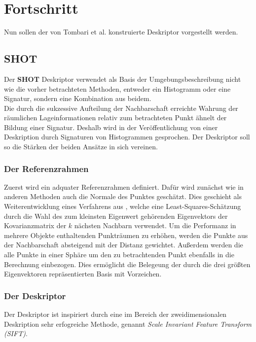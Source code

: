 \documentclass[12pt]{article}
\begin{document}
\section{Fortschritt}\label{prog}
Nun sollen der von Tombari et al. konstruierte Deskriptor vorgestellt werden. 

\subsection{SHOT}%
Der \textbf{SHOT} Deskriptor verwendet als Basis der Umgebungsbeschreibung nicht wie die vorher betrachteten Methoden, entweder ein Histogramm oder eine Signatur, sondern eine Kombination aus beidem.\\
Die durch die sukzessive Aufteilung der Nachbarschaft erreichte Wahrung der räumlichen Lageinformationen relativ zum betrachteten Punkt ähnelt der Bildung einer Signatur. Deshalb wird in der Veröffentlichung von einer Deskription durch Signaturen von Histogrammen gesprochen. Der Deskriptor soll so die Stärken der beiden Ansätze in sich vereinen.\\

\subsubsection{Der Referenzrahmen}
Zuerst wird ein adquater Referenzrahmen definiert. Dafür wird zunächst wie in anderen Methoden auch die Normale des Punktes geschätzt. Dies geschieht als Weiterentwicklung eines Verfahrens aus \cite{sr,pc}, welche eine Least-Squares-Schätzung durch die Wahl des zum kleinsten Eigenwert gehörenden Eigenvektors der Kovarianzmatrix der $k$ nächsten Nachbarn verwendet.
Um die Performanz in mehrere Objekte enthaltenden Punkträumen zu erhöhen, werden die Punkte aus der Nachbarschaft absteigend mit der Distanz gewichtet. Außerdem werden die alle Punkte in einer Sphäre um den zu betrachtenden Punkt ebenfalls in die Berechnung einbezogen.
Dies ermöglicht die Belegeung der durch die drei größten Eigenvektoren repräsentierten Basis mit Vorzeichen.
\subsubsection{Der Deskriptor}
Der Deskriptor ist inspiriert durch eine im Bereich der zweidimensionalen Deskription sehr erfogreiche Methode, genannt \textit{Scale Invariant Feature Transform (SIFT)}.
\end{document}
